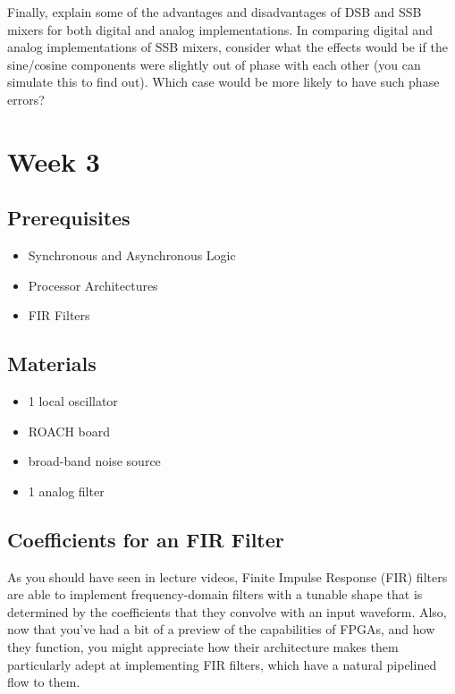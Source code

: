 \documentclass[11pt]{article}
\begin{document}
Finally, explain some of the advantages and disadvantages of DSB and SSB mixers for both digital and
analog implementations.  In comparing digital and analog implementations of SSB mixers, consider what the effects would
be if the sine/cosine components were slightly out of phase with each other (you can simulate this to find out).  Which
case would be more likely to have such phase errors?

\section{Week 3}
\subsection*{Prerequisites}

\begin{itemize}[noitemsep,nolistsep]
\item Synchronous and Asynchronous Logic
\item Processor Architectures
\item FIR Filters
\end{itemize}

\subsection*{Materials}

\begin{itemize}[noitemsep,nolistsep]
\item 1 local oscillator
\item ROACH board
\item broad-band noise source
\item 1 analog filter
\end{itemize}

\subsection{Coefficients for an FIR Filter} \label{fir_filter}

As you should have seen in lecture videos, Finite Impulse Response (FIR) filters are
able to implement frequency-domain filters with a tunable shape that is determined
by the coefficients that they convolve with an input waveform.
Also, now that you've had a bit of a preview of the capabilities of FPGAs, and how they function,
you might appreciate how their architecture makes them particularly adept at implementing
FIR filters, which have a natural pipelined flow to them.
\end{document}
